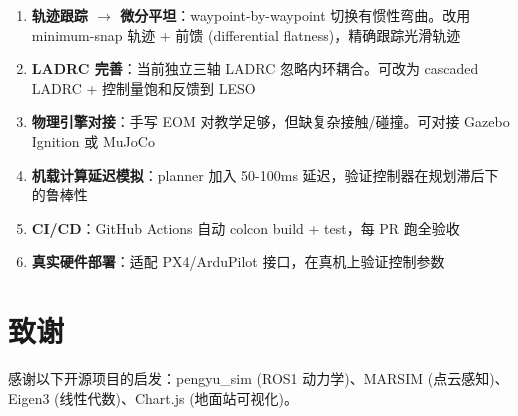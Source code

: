 \documentclass[12pt,a4paper]{article}
\begin{document}
\begin{enumerate}[leftmargin=*]
  \item \textbf{轨迹跟踪 $\to$ 微分平坦}：waypoint-by-waypoint 切换有惯性弯曲。改用 minimum-snap 轨迹 + 前馈 (differential flatness)，精确跟踪光滑轨迹
  \item \textbf{LADRC 完善}：当前独立三轴 LADRC 忽略内环耦合。可改为 cascaded LADRC + 控制量饱和反馈到 LESO
  \item \textbf{物理引擎对接}：手写 EOM 对教学足够，但缺复杂接触/碰撞。可对接 Gazebo Ignition 或 MuJoCo
  \item \textbf{机载计算延迟模拟}：planner 加入 50-100ms 延迟，验证控制器在规划滞后下的鲁棒性
  \item \textbf{CI/CD}：GitHub Actions 自动 colcon build + test，每 PR 跑全验收
  \item \textbf{真实硬件部署}：适配 PX4/ArduPilot 接口，在真机上验证控制参数
\end{enumerate}


\section*{致谢}
感谢以下开源项目的启发：pengyu\_sim (ROS1 动力学)、MARSIM (点云感知)、Eigen3 (线性代数)、Chart.js (地面站可视化)。
\end{document}
